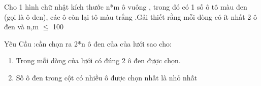 Cho 1 hình chữ nhật kích thước n*m ô vuông , trong đó có 1 số ô tô màu đen (gọi là ô đen), các ô còn lại tô màu trắng .Gải thiết rằng mỗi dòng có ít nhất 2 ô đen và n,m $\le$ 100

Yêu Cầu :cần chọn ra 2*n ô đen của của lưới sao cho:
\begin{enumerate}
	\item Trong mỗi dòng của lưới có đúng 2 ô đen được chọn.
	\item Số ô đen trong cột có nhiều ô được chọn nhất là nhỏ nhất
\end{enumerate}

\